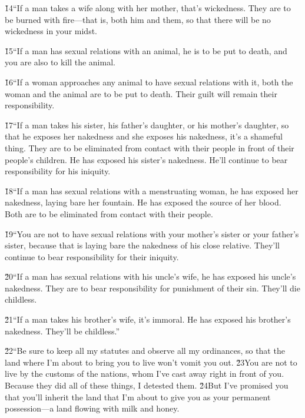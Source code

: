 \v{14}``If a man takes a wife along with her mother, that's wickedness. They are to be burned with fire---that is, both him and them, so that there will be no wickedness in your midst.

\v{15}``If a man has sexual relations with an animal, he is to be put to death, and you are also to kill the animal.

\v{16}``If a woman approaches any animal to have sexual relations with it, both the woman and the animal are to be put to death. Their guilt will remain their responsibility.

\v{17}``If a man takes his sister, his father's daughter, or his mother's daughter, so that he exposes her nakedness and she exposes his nakedness, it's a shameful thing. They are to be eliminated from contact with their people in front of their people's children. He has exposed his sister's nakedness. He'll continue to bear responsibility for his iniquity.

\v{18}``If a man has sexual relations with a menstruating woman, he has exposed her nakedness, laying bare her fountain. He has exposed the source of her blood. Both are to be eliminated from contact with their people.

\v{19}``You are not to have sexual relations with your mother's sister or your father's sister, because that is laying bare the nakedness of his close relative. They'll continue to bear responsibility for their iniquity.

\v{20}``If a man has sexual relations with his uncle's wife, he has exposed his uncle's nakedness. They are to bear responsibility for punishment of their sin. They'll die childless.

\v{21}``If a man takes his brother's wife, it's immoral. He has exposed his brother's nakedness. They'll be childless.''

\v{22}``Be sure to keep all my statutes and observe all my ordinances, so that the land where I'm about to bring you to live won't vomit you out. \v{23}You are not to live by the customs of the nations, whom I've cast away right in front of you. Because they did all of these things, I detested them. \v{24}But I've promised you that you'll inherit the land that I'm about to give you as your permanent possession---a land flowing with milk and honey.

